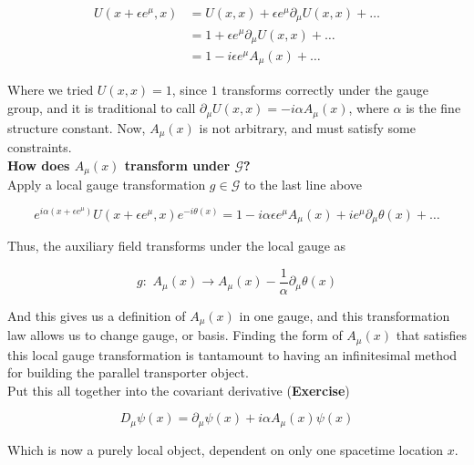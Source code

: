 \begin{align}
U(x + \epsilon e^\mu , x) &= U (x,x) + \epsilon e^\mu \partial_\mu U(x,x) + \dots \\
&= 1 + \epsilon e^\mu \partial_\mu U(x,x) +\dots \\
&= 1 - i \epsilon e^\mu A_\mu (x) + \dots
\end{align}

\noindent Where we tried $U(x,x)=1$, since $1$ transforms correctly under the gauge group, and it is traditional to call $\partial_\mu U(x,x) = -i \alpha A_\mu (x)$, where $\alpha$ is the fine structure constant. Now, $A_\mu (x)$ is not arbitrary, and must satisfy some constraints. \\

\noindent \textbf{How does $A_\mu (x)$ transform under $\mathcal{G}$?} \\

\noindent Apply a local gauge transformation $g \in \mathcal{G}$ to the last line above

\begin{equation}
e^{i \alpha (x + \epsilon e^\mu)} U(x + \epsilon e^\mu, x) e^{-i \theta(x)} = 1 - i \alpha \epsilon e^\mu A_\mu (x) + i e^\mu \partial_\mu \theta(x) + \dots
\end{equation}

\noindent Thus, the auxiliary field transforms under the local gauge as

\begin{equation}
g: \,\, A_\mu (x) \rightarrow A_\mu (x) - \frac{1}{\alpha} \partial_\mu \theta (x)
\end{equation}

\noindent And this gives us a definition of $A_\mu (x)$ in one gauge, and this transformation law allows us to change gauge, or basis. Finding the form of $A_\mu (x)$ that satisfies this local gauge transformation is tantamount to having an infinitesimal method for building the parallel transporter object. \\

\noindent Put this all together into the covariant derivative (\textbf{Exercise})

\begin{equation}
D_\mu \psi (x) = \partial_\mu \psi (x) + i \alpha A_\mu (x) \psi (x)
\end{equation}

\noindent Which is now a purely local object, dependent on only one spacetime location $x$. \\

